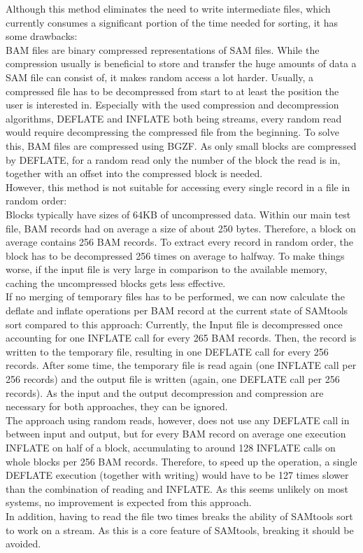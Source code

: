 Although this method eliminates the need to write intermediate files, which currently consumes a significant portion of the time needed for sorting, it has some drawbacks: \\
BAM files are binary compressed representations of SAM files. While the compression usually is beneficial to store and transfer the huge amounts of data a SAM file can consist of, it makes random access a lot harder. Usually, a compressed file has to be decompressed from start to at least the position the user is interested in. Especially with the used compression and decompression algorithms, DEFLATE and INFLATE both being streams, every random read would require decompressing the compressed file from the beginning. To solve this, BAM files are compressed using BGZF. As only small blocks are compressed by DEFLATE, for a random read only the number of the block the read is in, together with an offset into the compressed block is needed. \\
However, this method is not suitable for accessing every single record in a file in random order: \\
Blocks typically have sizes of 64KB of uncompressed data. Within our main test file, BAM records had on average a size of about 250 bytes. Therefore, a block on average contains 256 BAM records. To extract every record in random order, the block has to be decompressed 256 times on average to halfway. To make things worse, if the input file is very large in comparison to the available memory, caching  the uncompressed blocks gets less effective. \\
If no merging of temporary files has to be performed, we can now calculate the deflate and inflate operations per BAM record at the current state of SAMtools sort compared to this approach: Currently, the Input file is decompressed once accounting for one INFLATE call for every 265 BAM records. Then, the record is written to the temporary file, resulting in one DEFLATE call for every 256 records. After some time, the temporary file is read again (one INFLATE call per 256 records) and the output file is written (again, one DEFLATE call per 256 records). As the input and the output decompression and compression are necessary for both approaches, they can be ignored. \\
The approach using random reads, however, does not use any DEFLATE call in between input and output, but for every BAM record on average one execution INFLATE on half of a block, accumulating to around 128 INFLATE calls on whole blocks per 256 BAM records. Therefore, to speed up the operation, a single DEFLATE execution (together with writing) would have to be 127 times slower than the combination of reading and INFLATE. As this seems unlikely on most systems, no improvement is expected from this approach. \\
In addition, having to read the file two times breaks the ability of SAMtools sort to work on a stream. As this is a core feature of SAMtools, breaking it should be avoided.

